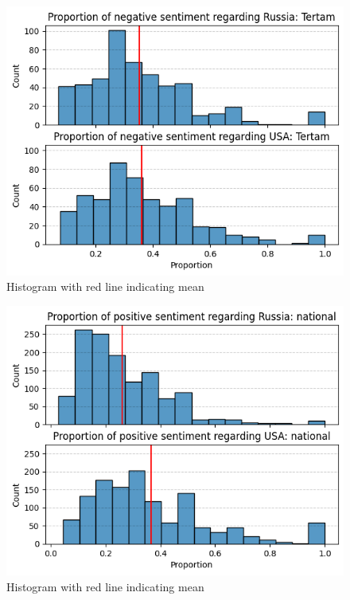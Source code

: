 \documentclass{IEEEtran}
\begin{document}
\begin{figure}
    \centering
    \includegraphics[width=1\linewidth]{figures/sig9.png}
    \caption{Histogram with red line indicating mean}
    \label{fig:negative_russia_tertam}
\end{figure}


\begin{figure}
    \centering
    \includegraphics[width=1\linewidth]{figures/sig10.png}
    \caption{Histogram with red line indicating mean}
    \label{fig:positive_russia_national}
\end{figure}
\end{document}

